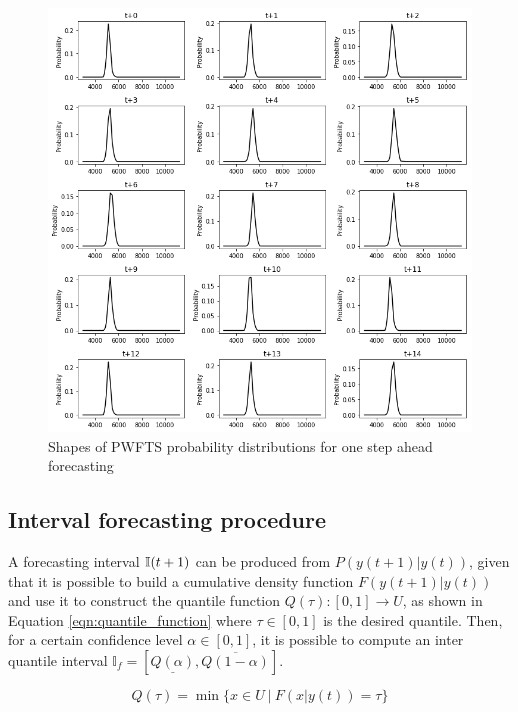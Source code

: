 \begin{figure}[htb]
    \centering
    \includegraphics[width=\textwidth]{figures/pwfts_sample_onestep_tiled.png}
    \caption{Shapes of PWFTS probability distributions for one step ahead forecasting}
    \label{fig:pwfts_sample_onestep_tiled}
\end{figure}

\subsection{Interval forecasting procedure}
\label{sec:pwfts_interval}

A forecasting interval $\mathbb{I} (t+1)$ can be produced from $P( y(t+1) | y(t))$, given that it is possible to build a cumulative density function $F( y(t+1) | y(t))$ and use it to construct the quantile function $Q(\tau): [0,1] \rightarrow U$, as shown in Equation \eqref{eqn:quantile_function} where $\tau \in [0,1]$ is the desired quantile. Then, for a certain confidence level $\alpha \in [0,1]$, it is possible to compute an inter quantile interval $\mathbb{I}_f = [\underline{Q(\alpha)}, \overline{Q(1 - \alpha)}]$.

\begin{equation}
Q(\tau) = \min\{x \in U\ |\ F(x | y(t)) = \tau \}
\label{eqn:quantile_function}
\end{equation}

